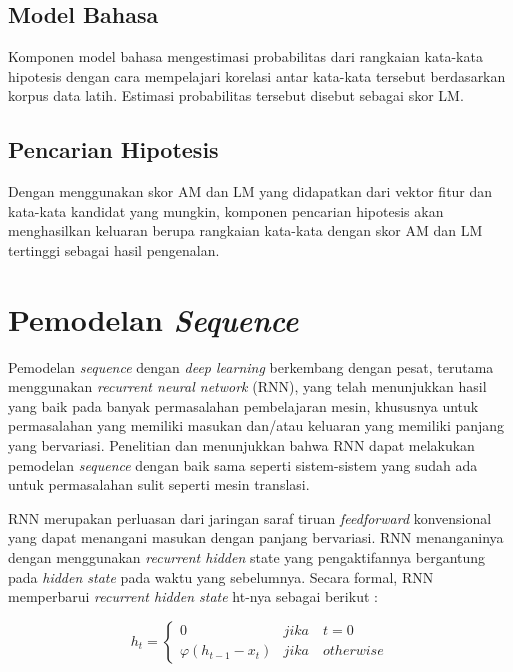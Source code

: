 \subsection{Model Bahasa}

Komponen model bahasa mengestimasi probabilitas dari rangkaian kata-kata hipotesis dengan cara mempelajari korelasi antar kata-kata tersebut berdasarkan korpus data latih. Estimasi probabilitas tersebut disebut sebagai skor LM.


\subsection{Pencarian Hipotesis}

Dengan menggunakan skor AM dan LM yang didapatkan dari vektor fitur dan kata-kata kandidat yang mungkin, komponen pencarian hipotesis akan menghasilkan keluaran berupa rangkaian kata-kata dengan skor AM dan LM tertinggi sebagai hasil pengenalan. 


\section{Pemodelan \textit{Sequence}}

Pemodelan \textit{sequence} dengan \textit{deep learning} berkembang dengan pesat, terutama menggunakan \textit{recurrent neural network} (RNN), yang telah menunjukkan hasil yang baik pada banyak permasalahan pembelajaran mesin, khususnya untuk permasalahan yang memiliki masukan dan/atau keluaran yang memiliki panjang yang bervariasi. Penelitian \textcite{Sutskever2014} dan \textcite{Bahdanau2015} menunjukkan bahwa RNN dapat melakukan pemodelan \textit{sequence} dengan baik sama seperti sistem-sistem yang sudah ada untuk permasalahan sulit seperti mesin translasi.
\bigskip

RNN merupakan perluasan dari jaringan saraf tiruan \textit{feedforward} konvensional yang dapat menangani masukan dengan panjang bervariasi. RNN menanganinya dengan menggunakan \textit{recurrent hidden} state yang pengaktifannya bergantung pada \textit{hidden state} pada waktu yang sebelumnya. Secara formal, RNN memperbarui \textit{recurrent hidden state} ht-nya sebagai berikut \parencite{Chung2014}:

\[ h_{t} =
  \begin{cases}
    0                           & jika \quad t=0 \\
    \varphi(h_{t-1} - x_{t})    & jika \quad otherwise
  \end{cases}
\]

